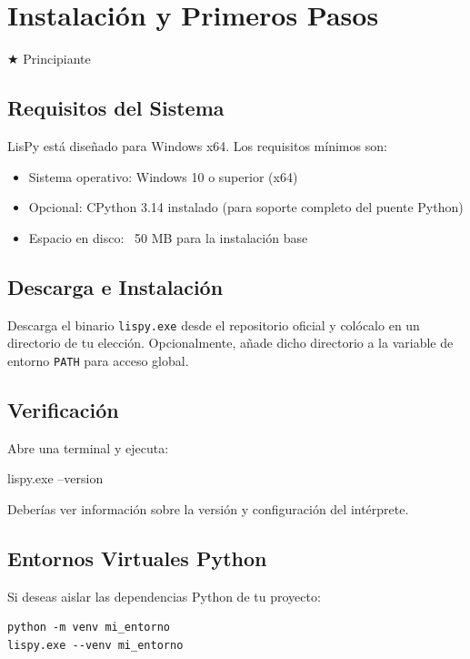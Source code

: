 \chapter{Instalación y Primeros Pasos}
\label{chap:installation}

{\huge$\bigstar$} Principiante

\section{Requisitos del Sistema}

LisPy está diseñado para Windows x64. Los requisitos mínimos son:

\begin{itemize}
\item Sistema operativo: Windows 10 o superior (x64)
\item Opcional: CPython 3.14 instalado (para soporte completo del puente Python)
\item Espacio en disco: ~50 MB para la instalación base
\end{itemize}

\section{Descarga e Instalación}

Descarga el binario \texttt{lispy.exe} desde el repositorio oficial y
colócalo en un directorio de tu elección. Opcionalmente, añade dicho
directorio a la variable de entorno \texttt{PATH} para acceso global.

\section{Verificación}

Abre una terminal y ejecuta:

\begin{lispcode}
lispy.exe --version
\end{lispcode}

Deberías ver información sobre la versión y configuración del intérprete.

\section{Entornos Virtuales Python}

Si deseas aislar las dependencias Python de tu proyecto:

\begin{lstlisting}[style=python,title=Terminal]
python -m venv mi_entorno
lispy.exe --venv mi_entorno
\end{lstlisting}

